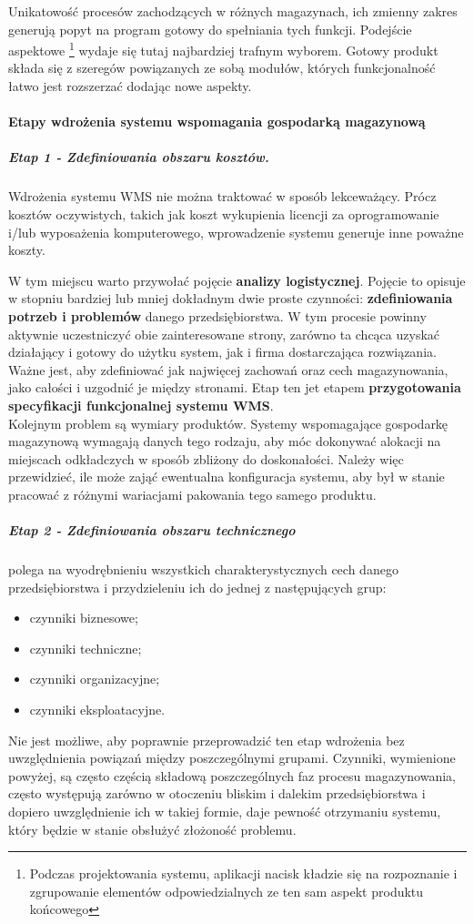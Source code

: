 	Unikatowość procesów zachodzących w różnych magazynach, ich zmienny zakres generują popyt
	na program gotowy do spełniania tych funkcji. Podejście aspektowe \footnote{
		Podczas projektowania systemu, aplikacji nacisk kładzie się na rozpoznanie i
		zgrupowanie elementów odpowiedzialnych ze ten sam aspekt produktu końcowego	
	} wydaje się tutaj najbardziej trafnym wyborem. Gotowy produkt składa się z szeregów
	powiązanych ze sobą modułów, których funkcjonalność łatwo jest rozszerzać dodając nowe
	aspekty.
	
	\paragraph{Etapy wdrożenia systemu wspomagania gospodarką magazynową}
		\subparagraph{Etap 1 - \textbf{Zdefiniowania obszaru kosztów.}} 			
		\label{c5:introducing_wms_stage_1}
			Wdrożenia systemu WMS nie można traktować w sposób lekceważący. Prócz kosztów oczywistych,
			takich jak koszt wykupienia licencji za oprogramowanie i/lub wyposażenia komputerowego,
			wprowadzenie systemu gene\-ruje inne poważne koszty. 
			
			W tym miejscu warto przywołać pojęcie \textbf{analizy logistycznej}. Pojęcie to opisuje w stopniu
			bardziej lub mniej dokładnym dwie proste czynności: \textbf{zdefiniowania potrzeb i problemów} 
			danego przedsiębiorstwa. W tym procesie powinny aktywnie uczestniczyć obie zainteresowane strony, 
			zarówno ta chcąca uzyskać działający i gotowy do użytku system, jak i firma dostarczająca
			rozwiązania. Ważne jest, aby zdefiniować jak najwięcej zachowań oraz cech magazynowania, jako całości
			i uzgodnić je między stronami. Etap ten jet etapem \textbf{przygotowania specyfikacji 
			funkcjonalnej systemu WMS}. \\
			
			Kolejnym problem są wymiary produktów. Systemy wspomagające gospodarkę magazynową wymagają danych
			tego rodzaju, aby móc dokonywać alokacji na miejscach odkładczych w sposób zbliżony do doskonałości.
			Należy więc przewidzieć, ile może zająć ewentualna konfiguracja systemu, aby był w stanie pracować
			z różnymi wariacjami pakowania tego samego produktu.
		\subparagraph{Etap 2 - \textbf{Zdefiniowania obszaru technicznego}} 	
		\label{c5:introducing_wms_stage_2}
			polega na wyodrębnieniu
			wszystkich charakterystycznych cech danego przedsiębiorstwa i
			przydzieleniu ich do jednej z następujących grup:
			\begin{itemize}
				\item czynniki biznesowe;
				\item czynniki techniczne;
				\item czynniki organizacyjne;
				\item czynniki eksploatacyjne.
			\end{itemize}
			Nie jest możliwe, aby poprawnie przeprowadzić ten etap wdrożenia bez uwzględnienia
			powiązań między poszczególnymi grupami. Czynniki, wymienione powyżej, są często
			częścią składową poszczególnych faz procesu magazynowania, często występują zarówno
			w otoczeniu bliskim i dalekim przedsiębiorstwa i dopiero uwzględnienie ich w takiej
			formie, daje pewność otrzymaniu systemu, który będzie w stanie obsłużyć 
			złożoność problemu.

